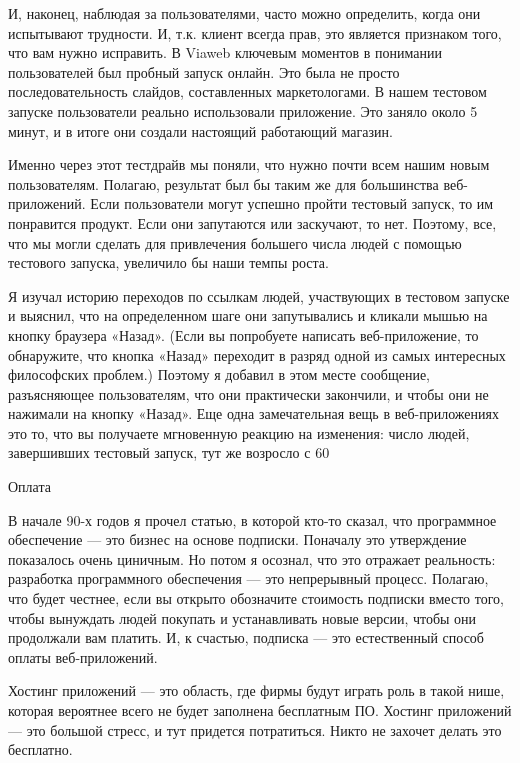 \documentclass[ebook,12pt,oneside,openany]{memoir}
\begin{document}
И, наконец, наблюдая за пользователями, часто можно определить, когда
они испытывают трудности. И, т.к. клиент всегда прав, это является
признаком того, что вам нужно исправить. В Viaweb ключевым моментов в
понимании пользователей был пробный запуск онлайн. Это была не просто
последовательность слайдов, составленных маркетологами. В нашем
тестовом запуске пользователи реально использовали приложение. Это
заняло около 5 минут, и в итоге они создали настоящий работающий
магазин.

Именно через этот тестдрайв мы поняли, что нужно почти всем нашим
новым пользователям. Полагаю, результат был бы таким же для
большинства веб-приложений. Если пользователи могут успешно пройти
тестовый запуск, то им понравится продукт. Если они запутаются или
заскучают, то нет. Поэтому, все, что мы могли сделать для привлечения
большего числа людей с помощью тестового запуска, увеличило бы наши
темпы роста.

Я изучал историю переходов по ссылкам людей, участвующих в тестовом
запуске и выяснил, что на определенном шаге они запутывались и кликали
мышью на кнопку браузера «Назад». (Если вы попробуете написать
веб-приложение, то обнаружите, что кнопка «Назад» переходит в разряд
одной из самых интересных философских проблем.) Поэтому я добавил в
этом месте сообщение, разъясняющее пользователям, что они практически
закончили, и чтобы они не нажимали на кнопку «Назад». Еще одна
замечательная вещь в веб-приложениях это то, что вы получаете
мгновенную реакцию на изменения: число людей, завершивших тестовый
запуск, тут же возросло с
60%

Оплата

В начале 90-х годов я прочел статью, в которой кто-то сказал, что
программное обеспечение — это бизнес на основе подписки. Поначалу это
утверждение показалось очень циничным. Но потом я осознал, что это
отражает реальность: разработка программного обеспечения — это
непрерывный процесс. Полагаю, что будет честнее, если вы открыто
обозначите стоимость подписки вместо того, чтобы вынуждать людей
покупать и устанавливать новые версии, чтобы они продолжали вам
платить. И, к счастью, подписка — это естественный способ оплаты
веб-приложений.

Хостинг приложений — это область, где фирмы будут играть роль в такой
нише, которая вероятнее всего не будет заполнена бесплатным ПО.
Хостинг приложений — это большой стресс, и тут придется потратиться.
Никто не захочет делать это бесплатно.
\end{document}
